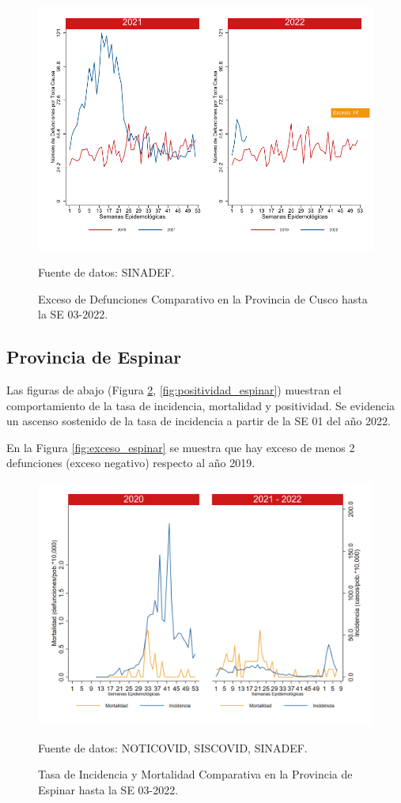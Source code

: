 \documentclass[12pt,a4paper,openany]{book}
\begin{document}
		\begin{figure}[h]
			\caption{Exceso de Defunciones Comparativo en la Provincia de Cusco hasta la SE 03-2022.}\label{fig:exceso_cusco}
			\begin{center}
				\includegraphics[width=0.7\linewidth]{../figuras/exceso_7.pdf}
			\end{center}
			{\footnotesize {Fuente de datos: SINADEF.}}
		\end{figure}
		
		\clearpage
		
		\subsection*{Provincia de Espinar}
		\noindent Las figuras de abajo (Figura \ref{fig:inc_mort_espinar}, \ref{fig:positividad_espinar}) muestran el comportamiento de la tasa de incidencia, mortalidad y positividad. Se evidencia un ascenso sostenido de la tasa de incidencia a partir de la SE 01 del año 2022.
		
		En la Figura \ref{fig:exceso_espinar} se muestra que hay exceso de menos 2 defunciones (exceso negativo) respecto al año 2019.
		
		\begin{figure}[h]
			\caption{Tasa de Incidencia y Mortalidad Comparativa en la Provincia de Espinar hasta la SE 03-2022.}\label{fig:inc_mort_espinar}
			\begin{center}
				\includegraphics[width=0.7\linewidth]{../figuras/incidencia_mortalidad_20_21_8.png}
			\end{center}
			{\footnotesize {Fuente de datos: NOTICOVID, SISCOVID, SINADEF.}}
		\end{figure}
		
\end{document}
